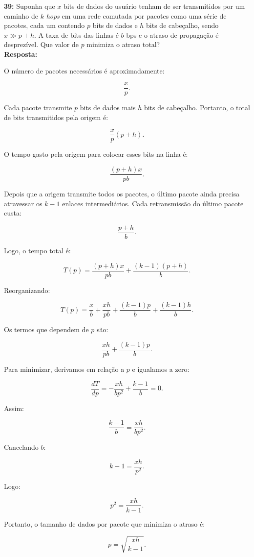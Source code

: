 \documentclass[12pt,a4paper]{report}
\begin{document}
\vspace{0.6cm}

\noindent \textbf{39:} Suponha que $x$ bits de dados do usuário tenham de ser transmitidos por um caminho de $k$ \textit{hops} em uma rede comutada por pacotes como uma série de pacotes, cada um contendo $p$ bits de dados e $h$ bits de cabeçalho, sendo $x \gg p + h$. A taxa de bits das linhas é $b$ bps e o atraso de propagação é desprezível. Que valor de $p$ minimiza o atraso total?\\
\textbf{Resposta:}

O número de pacotes necessários é aproximadamente:

\[
\frac{x}{p}.
\]

Cada pacote transmite $p$ bits de dados mais $h$ bits de cabeçalho. Portanto, o total de bits transmitidos pela origem é:

\[
\frac{x}{p}(p+h).
\]

O tempo gasto pela origem para colocar esses bits na linha é:

\[
\frac{(p+h)x}{pb}.
\]

Depois que a origem transmite todos os pacotes, o último pacote ainda precisa atravessar os $k-1$ enlaces intermediários. Cada retransmissão do último pacote custa:

\[
\frac{p+h}{b}.
\]

Logo, o tempo total é:

\[
T(p) = \frac{(p+h)x}{pb} + \frac{(k-1)(p+h)}{b}.
\]

Reorganizando:

\[
T(p) = \frac{x}{b} + \frac{xh}{pb} + \frac{(k-1)p}{b} + \frac{(k-1)h}{b}.
\]

Os termos que dependem de $p$ são:

\[
\frac{xh}{pb} + \frac{(k-1)p}{b}.
\]

Para minimizar, derivamos em relação a $p$ e igualamos a zero:

\[
\frac{dT}{dp} = -\frac{xh}{bp^2} + \frac{k-1}{b} = 0.
\]

Assim:

\[
\frac{k-1}{b} = \frac{xh}{bp^2}.
\]

Cancelando $b$:

\[
k-1 = \frac{xh}{p^2}.
\]

Logo:

\[
p^2 = \frac{xh}{k-1}.
\]

Portanto, o tamanho de dados por pacote que minimiza o atraso é:

\[
\boxed{p = \sqrt{\frac{xh}{k-1}}}.
\]
\end{document}
